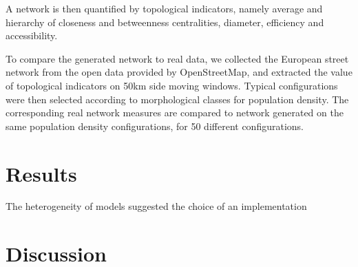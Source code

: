 \documentclass[letterpaper]{article}
\begin{document}
A network is then quantified by topological indicators, namely average and hierarchy of closeness and betweenness centralities, diameter, efficiency and accessibility.


To compare the generated network to real data, we collected the European street network from the open data provided by OpenStreetMap, and extracted the value of topological indicators on 50km side moving windows. Typical configurations were then selected according to morphological classes for population density. The corresponding real network measures are compared to network generated on the same population density configurations, for 50 different configurations.



\section{Results}

The heterogeneity of models suggested the choice of an implementation




\section{Discussion}
\end{document}
